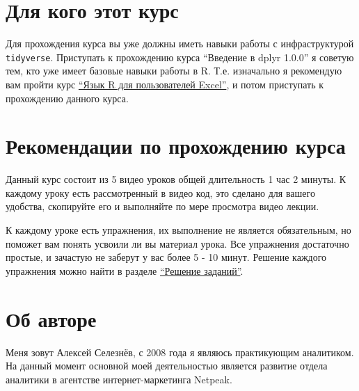 \documentclass[
]{book}
\begin{document}
\hypertarget{ux434ux43bux44f-ux43aux43eux433ux43e-ux44dux442ux43eux442-ux43aux443ux440ux441}{%
\section*{Для кого этот курс}\label{ux434ux43bux44f-ux43aux43eux433ux43e-ux44dux442ux43eux442-ux43aux443ux440ux441}}

Для прохождения курса вы уже должны иметь навыки работы с инфраструктурой \texttt{tidyverse}. Приступать к прохождению курса ``Введение в dplyr 1.0.0'' я советую тем, кто уже имеет базовые навыки работы в R. Т.е. изначально я рекомендую вам пройти курс \href{https://selesnow.github.io/r4excel_users/}{``Язык R для пользователей Excel''}, и потом приступать к прохождению данного курса.

\hypertarget{ux440ux435ux43aux43eux43cux435ux43dux434ux430ux446ux438ux438-ux43fux43e-ux43fux440ux43eux445ux43eux436ux434ux435ux43dux438ux44e-ux43aux443ux440ux441ux430}{%
\section*{Рекомендации по прохождению курса}\label{ux440ux435ux43aux43eux43cux435ux43dux434ux430ux446ux438ux438-ux43fux43e-ux43fux440ux43eux445ux43eux436ux434ux435ux43dux438ux44e-ux43aux443ux440ux441ux430}}

Данный курс состоит из 5 видео уроков общей длительность 1 час 2 минуты. К каждому уроку есть рассмотренный в видео код, это сделано для вашего удобства, скопируйте его и выполняйте по мере просмотра видео лекции.

К каждому уроке есть упражнения, их выполнение не является обязательным, но поможет вам понять усвоили ли вы материал урока. Все упражнения достаточно простые, и зачастую не заберут у вас более 5 - 10 минут. Решение каждого упражнения можно найти в разделе \href{решения-заданий.html}{``Решение заданий''}.

\hypertarget{ux43eux431-ux430ux432ux442ux43eux440ux435}{%
\section*{Об авторе}\label{ux43eux431-ux430ux432ux442ux43eux440ux435}}

Меня зовут Алексей Селезнёв, с 2008 года я являюсь практикующим аналитиком. На данный момент основной моей деятельностью является развитие отдела аналитики в агентстве интернет-маркетинга Netpeak.
\end{document}
